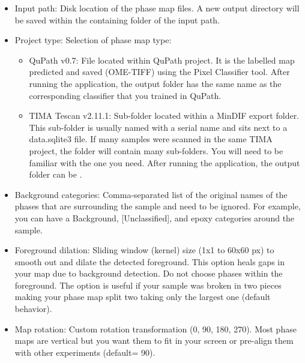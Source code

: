 		\begin{itemize}
		
		\item  Input path: Disk location of the phase map files. A new output directory will be saved within the containing folder of the input path.
		\item  Project type: Selection of phase map type:
			\begin{itemize}				
				\item QuPath v0.7: File located within QuPath project. It is the labelled map predicted and saved (OME-TIFF) using the Pixel Classifier tool. After running the application, the output folder has the same name as the corresponding classifier that you trained in QuPath.
				
				\item TIMA Tescan v2.11.1: Sub-folder located within a MinDIF export folder. This sub-folder is usually named with a serial name and sits next to a data.sqlite3 file. If many samples were scanned in the same TIMA project, the folder will contain many sub-folders. You will need to be familiar with the one you need. After running the application, the output folder can be  .
				
			\end{itemize}
		
		\item  Background categories: Comma-separated list of the original names of the phases that are surrounding the sample and need to be ignored. For example, you can have a Background, [Unclassified], and epoxy categories around the sample.
		
		\item  Foreground dilation: Sliding window (kernel) size (1x1 to 60x60 px) to smooth out and dilate the detected foreground. This option heals gaps in your map due to background detection. Do not choose phases within the foreground. The option is useful if your sample was broken in two pieces making your phase map split two taking only the largest one (default behavior). 
		
		\item  Map rotation: Custom rotation transformation (0, 90, 180, 270). Most phase maps are vertical but you want them to fit in your screen or pre-align them with other experiments (default= 90).
		

\end{itemize}
